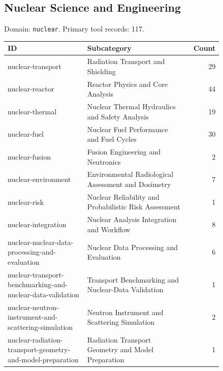 \subsection{Nuclear Science and Engineering}
\noindent Domain: \texttt{nuclear}. Primary tool records: 117.
\begin{longtable}{p{0.37\linewidth}p{0.47\linewidth}r}
ID & Subcategory & Count\\\hline\endhead
nuclear-transport & Radiation Transport and Shielding & 29\\
nuclear-reactor & Reactor Physics and Core Analysis & 44\\
nuclear-thermal & Nuclear Thermal Hydraulics and Safety Analysis & 19\\
nuclear-fuel & Nuclear Fuel Performance and Fuel Cycles & 30\\
nuclear-fusion & Fusion Engineering and Neutronics & 2\\
nuclear-environment & Environmental Radiological Assessment and Dosimetry & 7\\
nuclear-risk & Nuclear Reliability and Probabilistic Risk Assessment & 1\\
nuclear-integration & Nuclear Analysis Integration and Workflow & 8\\
nuclear-nuclear-data-processing-and-evaluation & Nuclear Data Processing and Evaluation & 6\\
nuclear-transport-benchmarking-and-nuclear-data-validation & Transport Benchmarking and Nuclear-Data Validation & 1\\
nuclear-neutron-instrument-and-scattering-simulation & Neutron Instrument and Scattering Simulation & 2\\
nuclear-radiation-transport-geometry-and-model-preparation & Radiation Transport Geometry and Model Preparation & 1\\
\end{longtable}
